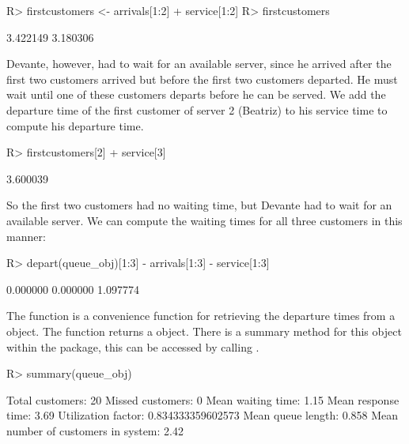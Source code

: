 \documentclass[article]{jss}
\begin{document}
\begin{CodeChunk}
\begin{Sinput}
R> firstcustomers <- arrivals[1:2] + service[1:2]
R> firstcustomers
 \end{Sinput}
 \begin{Soutput}
[1] 3.422149 3.180306
 \end{Soutput}
\end{CodeChunk}

Devante, however, had to wait for an available server, since he arrived after the first two customers arrived but before the first two customers departed. He must wait until one of these customers departs before he can be served. We add the departure time of the first customer of server 2 (Beatriz) to his service time to compute his departure time.

\begin{CodeChunk}
\begin{Sinput}
R> firstcustomers[2] + service[3]
\end{Sinput}
\begin{Soutput}
[1] 3.600039
\end{Soutput}
\end{CodeChunk}

So the first two customers had no waiting time, but Devante had to wait for an available server. We can compute the waiting times for all three customers in this manner:

\begin{CodeChunk}
\begin{Sinput}
R> depart(queue_obj)[1:3] - arrivals[1:3] - service[1:3]
\end{Sinput}
\begin{Soutput}
[1] 0.000000 0.000000 1.097774
\end{Soutput}
\end{CodeChunk}

The  function is a convenience function for retrieving the departure times from a  object. The  function returns a  object. There is a summary method for this object within the  package, this can be accessed by calling . 

\begin{CodeChunk}
\begin{Sinput}
R> summary(queue_obj)
\end{Sinput}
\begin{Soutput}
Total customers:
 20
Missed customers:
 0
Mean waiting time:
 1.15
Mean response time:
 3.69
Utilization factor:
 0.834333359602573
Mean queue length:
 0.858
Mean number of customers in system:
 2.42
\end{Soutput}
\end{CodeChunk}
\end{document}
